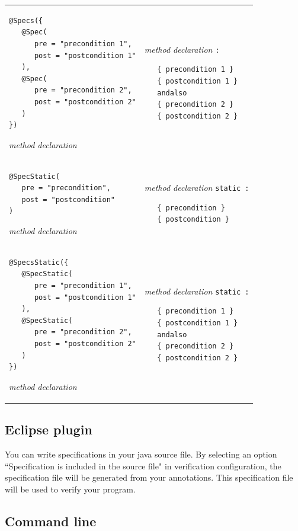 \documentclass{article}
\begin{document}
\begin{longtable}{ m{7cm} | m{5cm} }
\begin{verbatim}
@Specs({
   @Spec(
      pre = "precondition 1", 
      post = "postcondition 1"
   ),
   @Spec(
      pre = "precondition 2", 
      post = "postcondition 2"
   )
})
\end{verbatim}
\it{method declaration}
&
{\it method declaration} \texttt{:}
\begin{verbatim}
   { precondition 1 }
   { postcondition 1 }
   andalso
   { precondition 2 }
   { postcondition 2 }
\end{verbatim}
\\
\begin{verbatim}
@SpecStatic(
   pre = "precondition", 
   post = "postcondition"
)
\end{verbatim}
\it{method declaration}
&
{\it method declaration} \texttt{static :}
\begin{verbatim}
   { precondition }
   { postcondition }
\end{verbatim}
\\
\begin{verbatim}
@SpecsStatic({
   @SpecStatic(
      pre = "precondition 1", 
      post = "postcondition 1"
   ),
   @SpecStatic(
      pre = "precondition 2", 
      post = "postcondition 2"
   )
})
\end{verbatim}
\it{method declaration}
&
{\it method declaration} \texttt{static :}
\begin{verbatim}
   { precondition 1 }
   { postcondition 1 }
   andalso
   { precondition 2 }
   { postcondition 2 }
\end{verbatim}
\end{longtable}

\subsection*{Eclipse plugin}

You can write specifications in your java source file. By selecting an option ``Specification is included in the source file" in verification configuration, the specification file will be generated from your annotations. This specification file will be used to verify your program.

\subsection*{Command line}
\end{document}
